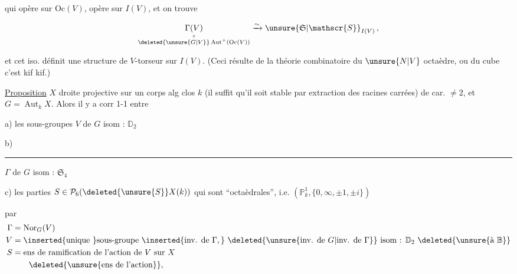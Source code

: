 
qui opère sur $\mathrm{Oc}(V)$, opère sur $I(V)$, et on trouve

\[
\underset{\substack{\shortparallel\\\deleted{\unsure{G|V}}\operatorname{Aut}^{+}(\mathrm{Oc}(V))}}{\Gamma(V)}
\xrightarrow{\sim}\unsure{\mathfrak{S}|\mathscr{S}}_{I(V)}\,,
\]

et cet iso.  définit une structure de $V$-torseur sur $I(V)$. (Ceci résulte de la théorie combinatoire du $\unsure{N|V}$ octaèdre, ou du cube c'est kif kif.)

\uline{Proposition}  $X$ droite projective  sur un corps alg clos $k$ (il suffit qu'il  soit stable par extraction des racines carrées) de car. $\ne 2$, et $G=\operatorname{Aut}_{k}X$. Alors il y a corr 1-1 entre

a) les sous-groupes $V$ de $G$ isom : $\mathbb{D}_2$

b) \rule{5em}{0.4pt} $\Gamma$ de $G$ isom : $\mathfrak{S}_4$ 

c) les parties $S\in\mathcal{P}_6(\deleted{\unsure{S}}X(k))$ qui sont ``octaèdrales'', i.e.   $(\mathbb P^1_k,\{0,\infty,\pm1,\pm i\})$

par
\[
\begin{aligned}
\Gamma&=\operatorname{Nor}_{G}(V)\\
V&=\inserted{\text{unique }}\text{sous-groupe }\inserted{\text{inv. de }\Gamma,}\ \deleted{\unsure{\text{inv. de }G|\text{inv. de }\Gamma}}\ \text{isom : }\mathbb D_2\ \deleted{\unsure{\text{à }\mathbb B}}\\
S&=\text{ens de ramification de l'action de }V\text{ sur }X\\
&\hspace{2em}\deleted{\unsure{\text{ens de l'action}}},
\end{aligned}
\]


